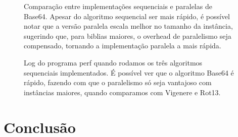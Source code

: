 \documentclass[12pt]{article}
\begin{document}
\begin{figure}[H]
    \caption{Comparação entre implementações sequenciais e paralelas de
        Base64. Apesar do algoritmo sequencial ser mais rápido, é 
        possível notar que a versão paralela escala melhor no tamanho da
        instância, sugerindo que, para biblias maiores, o overhead de
        paralelismo seja compensado, tornando a implementação paralela
        a mais rápida.}
    \label{fig:base64_parallelseq}
\end{figure}

\begin{figure}[H]
    \caption{Log do programa perf quando rodamos os três algoritmos 
    sequenciais implementados. É possível ver que o algoritmo Base64 é 
    rápido, fazendo com que o paralelismo só seja vantajoso com 
    instâncias maiores, quando comparamos com Vigenere e Rot13.}
    \label{fig:base64_seq_perf}
\end{figure}




\newpage
\section{Conclusão}
\end{document}
